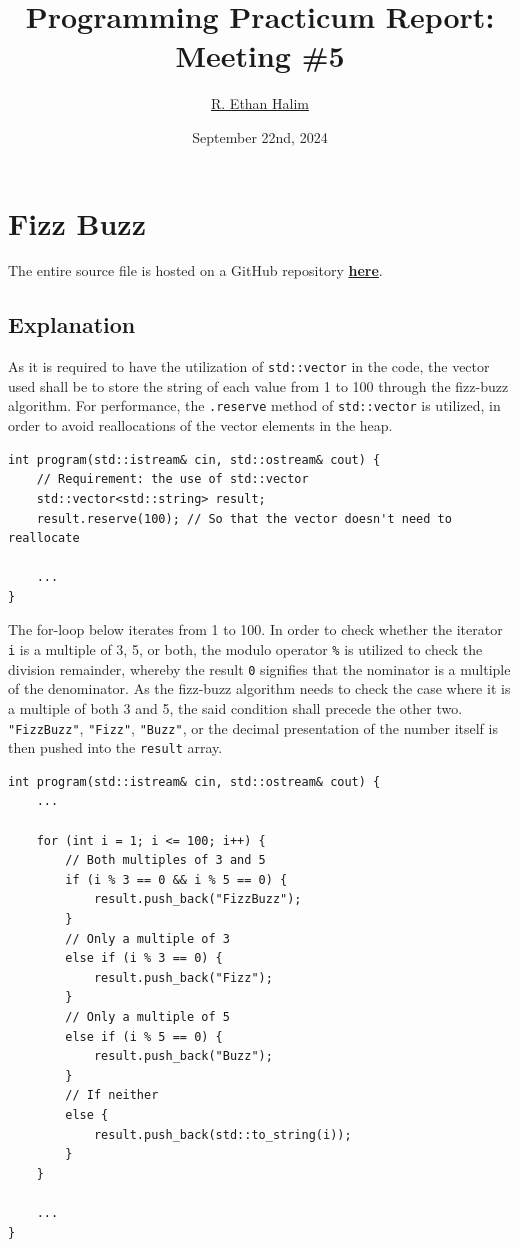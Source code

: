 \documentclass[12pt]{article}
\title{Programming Practicum Report:\\Meeting \#5}
\author{\href{https://github.com/avaxar}{R. Ethan Halim}}
\date{September 22nd, 2024}
\begin{document}
\maketitle

\section{Fizz Buzz}
The entire source file is hosted on a GitHub repository \href{https://github.com/avaxar/uni-practica-1/tree/main/week_5/01_fizz_buzz}{\textbf{here}}.

\subsection{Explanation}

As it is required to have the utilization of \texttt{std::vector} in the code, the vector used shall be to store the string of each value from 1 to 100 through the fizz-buzz algorithm. For performance, the \texttt{.reserve} method of \texttt{std::vector} is utilized, in order to avoid reallocations of the vector elements in the heap.

\begin{verbatim}
int program(std::istream& cin, std::ostream& cout) {
    // Requirement: the use of std::vector
    std::vector<std::string> result;
    result.reserve(100); // So that the vector doesn't need to reallocate

    ...
}
\end{verbatim}

The for-loop below iterates from 1 to 100. In order to check whether the iterator \texttt{i} is a multiple of 3, 5, or both, the modulo operator \texttt{\%} is utilized to check the division remainder, whereby the result \texttt{0} signifies that the nominator is a multiple of the denominator. As the fizz-buzz algorithm needs to check the case where it is a multiple of both 3 and 5, the said condition shall precede the other two. \texttt{"FizzBuzz"}, \texttt{"Fizz"}, \texttt{"Buzz"}, or the decimal presentation of the number itself is then pushed into the \texttt{result} array.

\begin{verbatim}
int program(std::istream& cin, std::ostream& cout) {
    ...

    for (int i = 1; i <= 100; i++) {
        // Both multiples of 3 and 5
        if (i % 3 == 0 && i % 5 == 0) {
            result.push_back("FizzBuzz");
        }
        // Only a multiple of 3
        else if (i % 3 == 0) {
            result.push_back("Fizz");
        }
        // Only a multiple of 5
        else if (i % 5 == 0) {
            result.push_back("Buzz");
        }
        // If neither
        else {
            result.push_back(std::to_string(i));
        }
    }

    ...
}
\end{verbatim}
\end{document}
